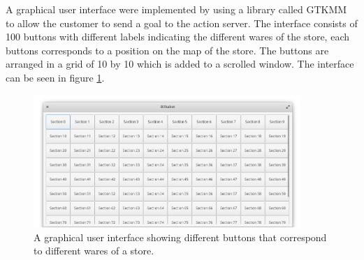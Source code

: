 A graphical user interface were implemented by using a library called GTKMM to allow the customer to send a goal to the action server. The interface consists of 100 buttons with different labels indicating the different wares of the store, each buttons corresponds to a position on the map of the store. The buttons are arranged in a grid of 10 by 10 which is added to a scrolled window. The interface can be seen in figure \ref{fig:move_gui}.

\begin{figure}[H]
    \centering
    \includegraphics[width=0.9\textwidth]{figures/gtkmm_gui2.png}
    \caption{A graphical user interface showing different buttons that correspond to different wares of a store.}
    \label{fig:move_gui}
\end{figure}